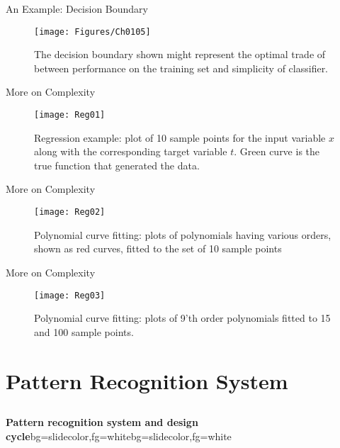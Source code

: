 \begin{frame}{An Example: Decision Boundary}
\begin{figure}
\texttt{[image: Figures/Ch0105]}
\caption{The decision boundary shown might represent the optimal trade of between performance on the training set and simplicity of classifier.}
\end{figure}
\end{frame}

\begin{frame}{More on Complexity}
\begin{figure}
\texttt{[image: Reg01]}
\caption{Regression example: plot of 10 sample points for the input variable $x$ along with the corresponding target variable $t$. Green curve is the true function that generated the data.}
\end{figure}
\end{frame}

\begin{frame}{More on Complexity}
\begin{figure}
\texttt{[image: Reg02]}
\caption{Polynomial curve fitting: plots of polynomials having various orders, shown as red curves, fitted to the set of 10 sample points}
\end{figure}
\end{frame}

\begin{frame}{More on Complexity}
\begin{figure}
\texttt{[image: Reg03]}
\caption{Polynomial curve fitting: plots of 9'th order polynomials fitted to 15 and 100 sample points.}
\end{figure}
\end{frame}

\section[PR Systems]{Pattern Recognition System}
\subsection{}

\begin{frame}{}
\begin{variableblock}{\centering \Large \textbf{\vspace{4pt}\newline Pattern recognition system and design cycle\vspace{4pt}}}{bg=slidecolor,fg=white}{bg=slidecolor,fg=white}
\end{variableblock}
\end{frame}


